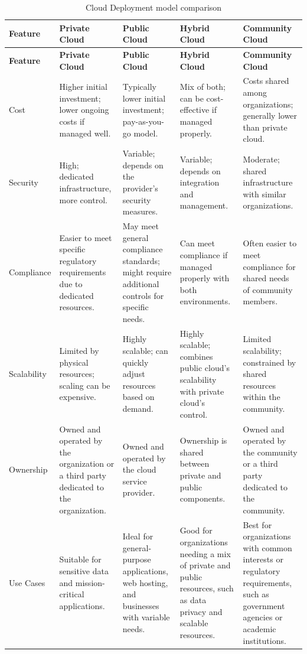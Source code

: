 \begingroup
\centering
\setlength{\tabcolsep}{6.5pt} %
\begin{longtable}{|p{2cm}| p{3cm} |p{3cm} |p{3cm}|p{3cm}|}
\caption{Cloud Deployment model comparison}
    \label{table:cloud_comp}
\hline
\rowcolor{grey!15}
\textbf{Feature} & \textbf{Private Cloud} & \textbf{Public Cloud} & \textbf{Hybrid Cloud} & \textbf{Community Cloud} \\
\hline
\endfirsthead
\hline
\rowcolor{grey!15}
\textbf{Feature} & \textbf{Private Cloud} & \textbf{Public Cloud} & \textbf{Hybrid Cloud} & \textbf{Community Cloud} \\
\hline
\endhead
\hline
\endfoot
\hline
\endlastfoot

Cost & Higher initial investment; lower ongoing costs if managed well. & Typically lower initial investment; pay-as-you-go model. & Mix of both; can be cost-effective if managed properly. & Costs shared among organizations; generally lower than private cloud. \\
\hline
Security & High; dedicated infrastructure, more control. & Variable; depends on the provider’s security measures. & Variable; depends on integration and management. & Moderate; shared infrastructure with similar organizations. \\
\hline
Compliance & Easier to meet specific regulatory requirements due to dedicated resources. & May meet general compliance standards; might require additional controls for specific needs. & Can meet compliance if managed properly with both environments. & Often easier to meet compliance for shared needs of community members. \\
\hline
Scalability & Limited by physical resources; scaling can be expensive. & Highly scalable; can quickly adjust resources based on demand. & Highly scalable; combines public cloud's scalability with private cloud’s control. & Limited scalability; constrained by shared resources within the community. \\
\hline
Ownership & Owned and operated by the organization or a third party dedicated to the organization. & Owned and operated by the cloud service provider. & Ownership is shared between private and public components. & Owned and operated by the community or a third party dedicated to the community. \\
\hline
Use Cases & Suitable for sensitive data and mission-critical applications. & Ideal for general-purpose applications, web hosting, and businesses with variable needs. & Good for organizations needing a mix of private and public resources, such as data privacy and scalable resources. & Best for organizations with common interests or regulatory requirements, such as government agencies or academic institutions. \\

\end{longtable}

